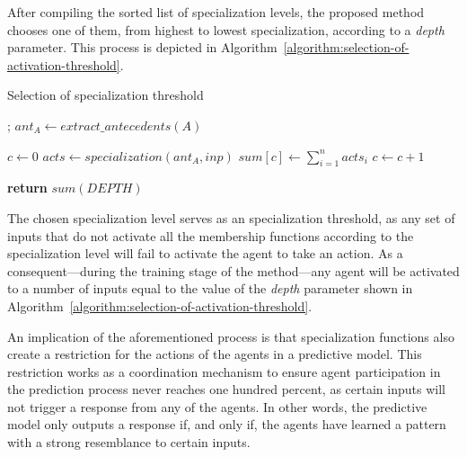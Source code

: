 \documentclass{ieeeaccess}
\begin{document}
After compiling the sorted list of specialization levels, the proposed method chooses one of them, from highest to lowest specialization, according to a \textit{depth} parameter. This process is depicted in Algorithm~\ref{algorithm:selection-of-activation-threshold}.

\begin{algorithm}
  \caption{Selection of specialization threshold}
  \label{algorithm:selection-of-activation-threshold}
  \begin{algorithmic}[1]
    ;
    \State $ant_A\gets extract\_antecedents(A)$

    \State $c\gets 0$
    \State $acts \gets specialization(ant_A, inp)$
    \State $sum[c] \gets \sum_{i = 1}^{n} acts_i$
    \State $c \gets c + 1$
    \EndFor

    \State \textbf{return} $sum(DEPTH)$
    \EndProcedure
  \end{algorithmic}
\end{algorithm}


The chosen specialization level serves as an specialization threshold, as any set of inputs that do not activate all the membership functions according to the specialization level will fail to activate the agent to take an action. As a consequent---during the training stage of the method---any agent will be activated to a number of inputs equal to the value of the \textit{depth} parameter shown in Algorithm~\ref{algorithm:selection-of-activation-threshold}.

An implication of the aforementioned process is that specialization functions also create a restriction for the actions of the agents in a predictive model. This restriction works as a coordination mechanism to ensure agent participation in the prediction process never reaches one hundred percent, as certain 
inputs will not trigger a response from any of the agents. In other words, the predictive model only outputs a response if, and only if, the agents have learned a pattern with a strong resemblance to certain inputs.
\end{document}
